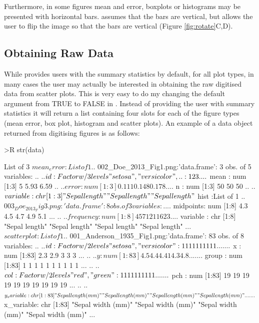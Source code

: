 \documentclass[article]{jss}
\newcommand{\fct}[1]{\code{#1()}}
\begin{document}
Furthermore, in some figures mean and error, boxplots or histograms may be presented with horizontal bars. \fct{metaDigitise} assumes that the bars are vertical, but allows the user to flip the image so that the bars are vertical (Figure \ref{fig:rotate}C,D).

\subsection{Obtaining Raw Data}

While \fct{metaDigitise} provides users with the summary statistics by default, for all plot types, in many cases the user may actually be interested in obtaining the raw digitised data from scatter plots. This is very easy to do my changing the default  argument from TRUE to FALSE in \fct{metaDigitise}. Instead of providing the user with summary statistics it will return a list containing four slots for each of the figure types (mean error, box plot, histogram and scatter plots). An example of a data object returned from digitising figures is as follows:

\begin{CodeChunk}

\begin{CodeInput}
>R str(data)
\end{CodeInput}

\begin{CodeOutput}
List of 3
 $ mean_error :List of 1
  ..$ 002_Doe_2013_Fig1.png:'data.frame': 3 obs. of  5 variables:
  .. ..$ id      : Factor w/ 3 levels "setosa","versicolor",..: 1 2 3
  .. ..$ mean    : num [1:3] 5 5.93 6.59
  .. ..$ error   : num [1:3] 0.111 0.148 0.178
  .. ..$ n       : num [1:3] 50 50 50
  .. ..$ variable: chr [1:3] "Sepal length" "Sepal length" "Sepal length"
 $ hist       :List of 1
  ..$ 003_Doe_2013_Fig3.png:'data.frame': 8 obs. of  3 variables:
  .. ..$ midpoints: num [1:8] 4.3 4.5 4.7 4.9 5.1 ...
  .. ..$ frequency: num [1:8] 4 5 7 12 11 6 2 3
  .. ..$ variable : chr [1:8] "Sepal length" "Sepal length" "Sepal length" "Sepal length" ...
 $ scatterplot:List of 1
  ..$ 001_Anderson_1935_Fig1.png:'data.frame':  83 obs. of  8 variables:
  .. ..$ id        : Factor w/ 2 levels "setosa","versicolor": 1 1 1 1 1 1 1 1 1 1 ...
  .. ..$ x         : num [1:83] 2.3 2.9 3 3 3 ...
  .. ..$ y         : num [1:83] 4.5 4.4 4.41 4.3 4.8 ...
  .. ..$ group     : num [1:83] 1 1 1 1 1 1 1 1 1 1 ...
  .. ..$ col       : Factor w/ 2 levels "red","green": 1 1 1 1 1 1 1 1 1 1 ...
  .. ..$ pch       : num [1:83] 19 19 19 19 19 19 19 19 19 19 ...
  .. ..$ y_variable: chr [1:83] "Sepal length (mm)" "Sepal length (mm)" "Sepal length (mm)" "Sepal length (mm)" ...
  .. ..$ x_variable: chr [1:83] "Sepal width (mm)" "Sepal width (mm)" "Sepal width (mm)" "Sepal width (mm)" ...
\end{CodeOutput}
\end{CodeChunk}
\end{document}
